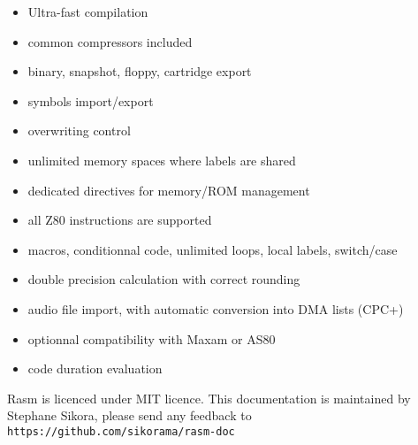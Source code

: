 \begin{xen}
\begin{itemize}[noitemsep]
\item Ultra-fast compilation
\item common compressors included
\item binary, snapshot, floppy, cartridge export
\item symbols import/export
\item overwriting control
\item unlimited memory spaces where labels are shared
\item dedicated directives for memory/ROM management
\item all Z80 instructions are supported
\item macros, conditionnal code, unlimited loops, local labels, switch/case
\item double precision calculation with correct rounding
\item audio file import, with automatic conversion into DMA lists (CPC+)
\item optionnal compatibility with Maxam or AS80
\item code duration evaluation
\end{itemize}

Rasm is licenced under MIT licence. 
\medbreak
This documentation is maintained by Stephane Sikora, please send any feedback to \texttt{https://github.com/sikorama/rasm-doc}

\end{xen}

